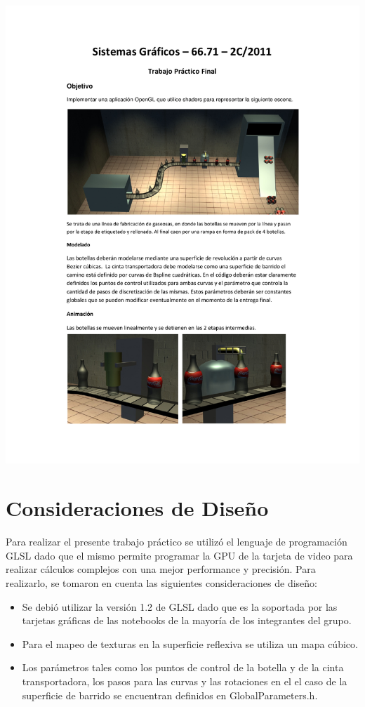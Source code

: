 \documentclass[11pt]{article}
\begin{document}
\begin{center}
\includegraphics[trim = 25mm 20mm 10mm 25mm, clip,height=0.95\textheight,width=1.04\textwidth,page={4}]{tpfinal-c2-2011.pdf}
\end{center}

\newpage


\section{Consideraciones de Dise\~no}
Para realizar el presente trabajo pr\'actico se utiliz\'o el lenguaje de programaci\'on GLSL dado que el mismo permite programar la GPU 
de la tarjeta de video para realizar c\'alculos complejos con una mejor performance y precisi\'on.
  Para realizarlo, se tomaron en cuenta las siguientes consideraciones de dise\~no:
\begin{itemize} 
 \item Se debi\'o utilizar la versi\'on 1.2 de GLSL dado que es la soportada por las tarjetas gr\'aficas de las notebooks de la mayor\'ia de 
los integrantes del grupo.
 \item Para el mapeo de texturas en la superficie reflexiva se utiliza un mapa c\'ubico.
 \item Los parámetros tales como los puntos de control de la botella y de la cinta transportadora, los pasos para las curvas y las rotaciones en el
el caso de la superficie de barrido se encuentran definidos en GlobalParameters.h.
\end{itemize}
\end{document}
